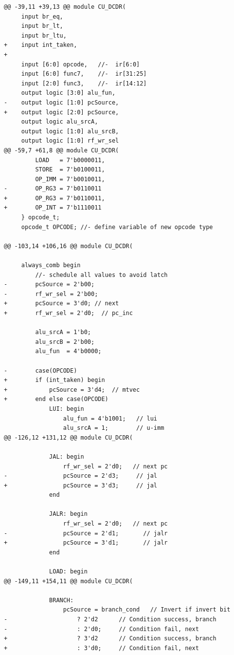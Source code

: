 \documentclass{article}
\begin{document}
\begin{verbatim}
@@ -39,11 +39,13 @@ module CU_DCDR(
     input br_eq, 
     input br_lt, 
     input br_ltu,
+    input int_taken,
+    
     input [6:0] opcode,   //-  ir[6:0]
     input [6:0] func7,    //-  ir[31:25]
     input [2:0] func3,    //-  ir[14:12] 
     output logic [3:0] alu_fun,
-    output logic [1:0] pcSource,
+    output logic [2:0] pcSource,
     output logic alu_srcA,
     output logic [1:0] alu_srcB, 
     output logic [1:0] rf_wr_sel
@@ -59,7 +61,8 @@ module CU_DCDR(
         LOAD   = 7'b0000011,
         STORE  = 7'b0100011,
         OP_IMM = 7'b0010011,
-        OP_RG3 = 7'b0110011
+        OP_RG3 = 7'b0110011,
+        OP_INT = 7'b1110011
     } opcode_t;
     opcode_t OPCODE; //- define variable of new opcode type
     
@@ -103,14 +106,16 @@ module CU_DCDR(
        
     always_comb begin 
         //- schedule all values to avoid latch
-        pcSource = 2'b00;  
-        rf_wr_sel = 2'b00; 
+        pcSource = 3'd0; // next
+        rf_wr_sel = 2'd0;  // pc_inc 
         
         alu_srcA = 1'b0;   
         alu_srcB = 2'b00;    
         alu_fun  = 4'b0000;
         
-        case(OPCODE)
+        if (int_taken) begin
+            pcSource = 3'd4;  // mtvec 
+        end else case(OPCODE)
             LUI: begin
                 alu_fun = 4'b1001;   // lui
                 alu_srcA = 1;        // u-imm 
@@ -126,12 +131,12 @@ module CU_DCDR(
             
             JAL: begin
                 rf_wr_sel = 2'd0;   // next pc
-                pcSource = 2'd3;     // jal
+                pcSource = 3'd3;     // jal
             end
             
             JALR: begin
                 rf_wr_sel = 2'd0;   // next pc
-                pcSource = 2'd1;       // jalr
+                pcSource = 3'd1;       // jalr
             end
             
             LOAD: begin
@@ -149,11 +154,11 @@ module CU_DCDR(
             
             BRANCH: 
                 pcSource = branch_cond   // Invert if invert bit 
-                    ? 2'd2      // Condition success, branch
-                    : 2'd0;     // Condition fail, next
+                    ? 3'd2      // Condition success, branch
+                    : 3'd0;     // Condition fail, next
             

\end{verbatim}
\end{document}
